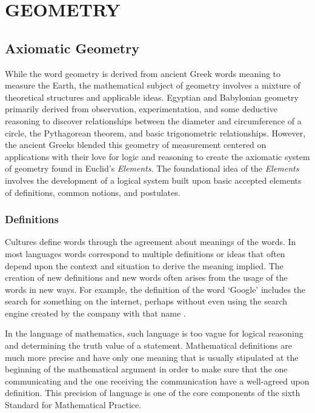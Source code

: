 \documentclass[
]{book}
\theoremstyle{definition}
\theoremstyle{definition}
\theoremstyle{definition}
\theoremstyle{definition}
\theoremstyle{remark}
\begin{document}
\hypertarget{part-geometry}{%
\part{GEOMETRY}\label{part-geometry}}

\hypertarget{constructions}{%
\chapter{Axiomatic Geometry}\label{constructions}}

While the word geometry is derived from ancient Greek words meaning to measure the Earth, the mathematical subject of geometry involves a mixture of theoretical structures and applicable ideas. Egyptian and Babylonian geometry primarily derived from observation, experimentation, and some deductive reasoning to discover relationships between the diameter and circumference of a circle, the Pythagorean theorem, and basic trigonometric relationships. However, the ancient Greeks blended this geometry of measurement centered on applications with their love for logic and reasoning to create the axiomatic system of geometry found in Euclid's \emph{Elements}. The foundational idea of the \emph{Elements} involves the development of a logical system built upon basic accepted elements of definitions, common notions, and postulates.

\hypertarget{definitions-1}{%
\section{Definitions}\label{definitions-1}}

Cultures define words through the agreement about meanings of the words. In most languages words correspond to multiple definitions or ideas that often depend upon the context and situation to derive the meaning implied. The creation of new definitions and new words often arises from the usage of the words in new ways. For example, the definition of the word `Google' includes the search for something on the internet, perhaps without even using the search engine created by the company with that name \citep{Edwards2008}.

In the language of mathematics, such language is too vague for logical reasoning and determining the truth value of a statement. Mathematical definitions are much more precise and have only one meaning that is usually stipulated at the beginning of the mathematical argument in order to make sure that the one communicating and the one receiving the communication have a well-agreed upon definition. This precision of language is one of the core components of the sixth Standard for Mathematical Practice.
\end{document}

